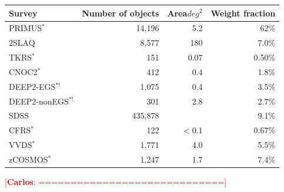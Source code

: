 \documentclass[preprint]{aastex}
\newcommand{\cc}[1]{\textcolor{red}{[{\bf Carlos}: #1]}}
\begin{document}
\begin{table}[!ht]
\label{tbl:weistats}
\begin{center}
\begin{tabular}{ l r r r }\hline \hline
Survey & Number of objects & Area$deg^2$ & Weight fraction \\ \hline 
PRIMUS$^*$ &14,196 &5.2 & 62\% \\
2SLAQ  &8,577 & 180 & 7.0\%\\
TKRS$^*$  &151  & 0.07& 0.50\%\\
CNOC2$^*$ &412  &0.4 & 1.8\%\\
DEEP2-EGS$^{*!}$ &1,075  & 0.4 & 3.5\%\\
DEEP2-nonEGS$^{*!}$ &301  & 2.8 & 2.7\%\\
SDSS &435,878  & & 9.1\%\\
CFRS$^*$ &122  & $<$0.1 & 0.67\%\\
VVDS$^*$ &1,771  &4.0  & 5.5\%\\
zCOSMOS$^*$ &1,247 &1.7  & 7.4\% \\ \hline \hline
\end{tabular}
\end{center} 
\end{table}


\cc{=============================} 
\end{document}
